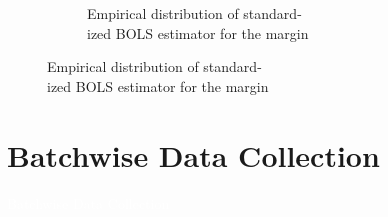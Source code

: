 \documentclass[11pt,table]{beamer}
\begin{document}
\begin{frame}
\begin{figure}[h]
\begin{center}
\begin{subfigure}[t]{0.49\textwidth}
           \caption{Empirical distribution of standard-\\\quad\; ized BOLS estimator for the margin}
           \label{fig:Empirical distribution of standardized BOLS estimator for the margin}	
  \end{subfigure}   
\end{center}
\vspace*{-4.5ex}
\end{figure}
\begin{center}
\end{center}

\end{frame}

\section{Batchwise Data Collection}
{
\begin{frame}
\centering
\Huge
\textcolor{white}{Batchwise Data Collection}
\thispagestyle{empty}
\end{frame}
}
\end{document}
